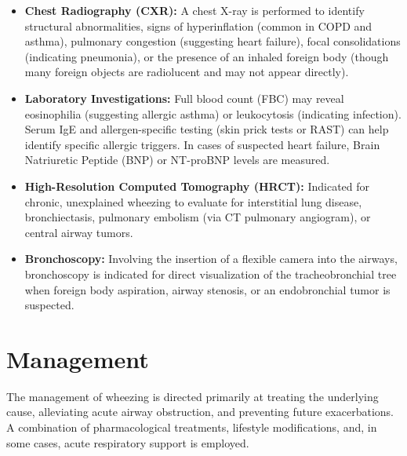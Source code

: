 \begin{itemize}
    \item \textbf{Chest Radiography (CXR):} A chest X-ray is performed to identify structural abnormalities, signs of hyperinflation (common in COPD and asthma), pulmonary congestion (suggesting heart failure), focal consolidations (indicating pneumonia), or the presence of an inhaled foreign body (though many foreign objects are radiolucent and may not appear directly).
    \item \textbf{Laboratory Investigations:} Full blood count (FBC) may reveal eosinophilia (suggesting allergic asthma) or leukocytosis (indicating infection). Serum IgE and allergen-specific testing (skin prick tests or RAST) can help identify specific allergic triggers. In cases of suspected heart failure, Brain Natriuretic Peptide (BNP) or NT-proBNP levels are measured.
    \item \textbf{High-Resolution Computed Tomography (HRCT):} Indicated for chronic, unexplained wheezing to evaluate for interstitial lung disease, bronchiectasis, pulmonary embolism (via CT pulmonary angiogram), or central airway tumors.
    \item \textbf{Bronchoscopy:} Involving the insertion of a flexible camera into the airways, bronchoscopy is indicated for direct visualization of the tracheobronchial tree when foreign body aspiration, airway stenosis, or an endobronchial tumor is suspected.
\end{itemize}

\section*{Management}
The management of wheezing is directed primarily at treating the underlying cause, alleviating acute airway obstruction, and preventing future exacerbations. A combination of pharmacological treatments, lifestyle modifications, and, in some cases, acute respiratory support is employed.

